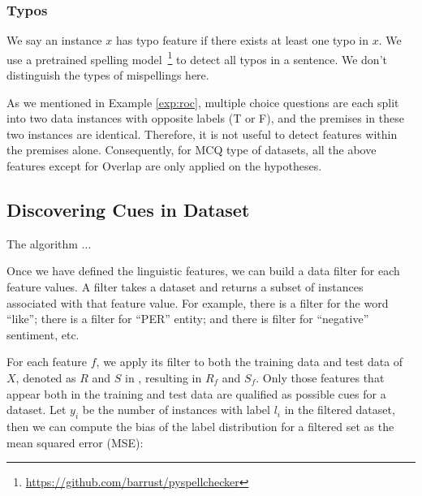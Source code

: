 \subsubsection{Typos}
We say an instance $x$ has typo feature if there exists at least one
typo in $x$.
We use a pretrained spelling model~\footnote{\url{https://github.com/barrust/pyspellchecker}} 
to detect all typos in a sentence. We don't distinguish the types of mispellings here. 

As we mentioned in Example \ref{exp:roc}, multiple choice questions are each split into 
two data instances with opposite labels (T or F), and the premises in these two
instances are identical. Therefore, it is not useful to detect features within the premises
alone. Consequently, for MCQ type of datasets, all the above features except for Overlap
are only applied on the hypotheses.

\subsection{Discovering Cues in Dataset}
\label{sec:evaldata}

\begin{algorithm}[th]

\caption{The algorithm ...}
\end{algorithm}


Once we have defined the linguistic features, we can build a data filter for
each feature values. A filter takes a dataset and returns
a subset of instances associated with that feature value. For example,
there is a filter for the word ``like''; there is a filter for ``PER'' entity;
and there is filter for ``negative'' sentiment, etc. 

For each feature $f$, we apply its filter to both the training data and test data
of $X$, denoted as $R$ and $S$ in ,
resulting in $R_f$ and $S_f$. 
Only those features that appear both in the training and test data
are qualified as possible cues for a dataset.
Let $y_i$ be the number of instances with label $l_i$ in the filtered
dataset, then we can compute the bias of the label distribution for a filtered
set as the mean squared error (MSE):

